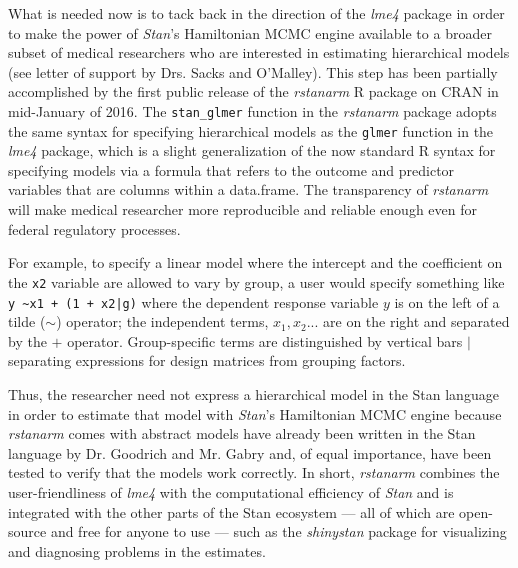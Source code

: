 \documentclass[11pt,notitlepage]{article}
\begin{document}
What is needed now is to tack back in the direction of the \textit{lme4} package in order to
make the power of \textit{Stan}'s Hamiltonian MCMC engine available to a broader subset of medical
researchers who are interested in estimating hierarchical models (see letter of support 
by Drs. Sacks and O'Malley). This step has been partially accomplished
by the first public release of the \textit{rstanarm} R package on CRAN in mid-January of 2016. The 
\texttt{stan\_glmer} function in the \textit{rstanarm} package adopts the same syntax for specifying hierarchical
models as the \texttt{glmer} function in the \textit{lme4} package, which is a slight generalization
of the now standard R syntax for specifying models via a formula that refers to the outcome and 
predictor variables that are columns within a data.frame. The transparency of \textit{rstanarm} will 
make medical researcher more reproducible and reliable enough even for federal regulatory processes. 

For example, to specify a linear model where the intercept and the coefficient on the \texttt{x2} 
variable are allowed to vary by group, a user would specify something like \texttt{y \textasciitilde x1 + (1 + x2|g)}
where the dependent response variable $y$ is on the left of a tilde ($\sim$) operator; 
the independent terms, $x_1, x_2...$ are on the right and separated by the $+$ 
operator. Group-specific terms are distinguished by vertical bars $|$ separating expressions for design matrices from grouping factors.

Thus, the researcher need not express a hierarchical model in the Stan language in order to estimate that model with \textit{Stan}'s Hamiltonian
MCMC engine because \textit{rstanarm} comes with abstract models have already been written in the Stan language by 
Dr. Goodrich and Mr. Gabry and, of equal importance, have been tested to verify that the models work correctly. In short, 
\textit{rstanarm} combines the user-friendliness of \textit{lme4} with the 
computational efficiency of \textit{Stan} and is integrated with the other parts of the Stan ecosystem
--- all of which are open-source and free for anyone to use --- such as the \textit{shinystan} package for 
visualizing and diagnosing problems in the estimates.
\end{document}
